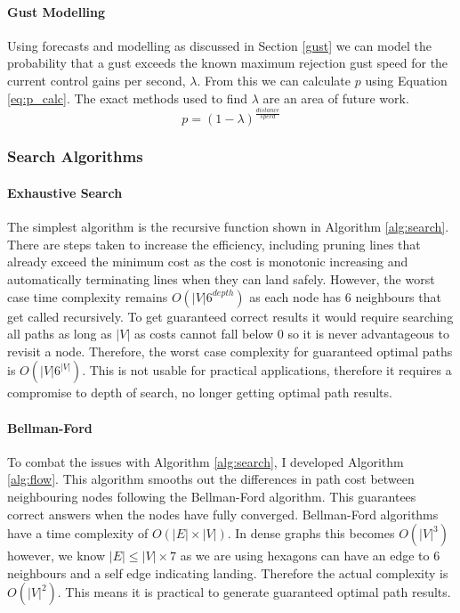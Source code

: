 \paragraph{Gust Modelling}
Using forecasts and modelling as discussed in Section \ref{gust} we can model the probability that a gust exceeds the known maximum rejection gust speed for the current control gains per second, $\lambda$. From this we can calculate $p$ using Equation \ref{eq:p_calc}. The exact methods used to find $\lambda$ are an area of future work.
\begin{equation}\label{eq:p_calc}
    p = (1-\lambda)^{\frac{distance}{speed}}
\end{equation}

\subsubsection{Search Algorithms}\label{sub_sub_section:tgt_search}


\paragraph{Exhaustive Search}
The simplest algorithm is the recursive function shown in Algorithm \ref{alg:search}. There are steps taken to increase the efficiency, including pruning lines that already exceed the minimum cost as the cost is monotonic increasing and automatically terminating lines when they can land safely. However, the worst case time complexity remains $O(|V|6^{depth})$ as each node has 6 neighbours that get called recursively. To get guaranteed correct results it would require searching all paths as long as $|V|$ as costs cannot fall below 0 so it is never advantageous to revisit a node. Therefore, the worst case complexity for guaranteed optimal paths is $O(|V|6^{|V|})$. This is not usable for practical applications, therefore it requires a compromise to depth of search, no longer getting optimal path results.
\paragraph{Bellman-Ford}
To combat the issues with Algorithm \ref{alg:search}, I developed Algorithm \ref{alg:flow}. This algorithm smooths out the differences in path cost between neighbouring nodes following the Bellman-Ford algorithm. This guarantees correct answers when the nodes have fully converged. Bellman-Ford algorithms have a time complexity of $O(|E|\times |V|)$. In dense graphs this becomes  $O(|V|^3)$ however, we know $|E| \leq |V| \times 7$ as we are using hexagons can have an edge to 6 neighbours and a self edge indicating landing. Therefore the actual complexity is $O(|V|^2)$\cite{cormen2009}. This means it is practical to generate guaranteed optimal path results.


